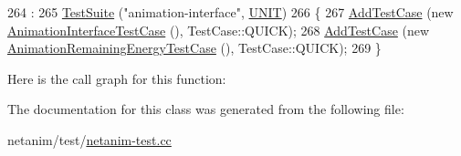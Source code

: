 \begin{DoxyCode}
264                                  :
265     \hyperlink{classns3_1_1TestSuite_a904b0c40583b744d30908aeb94636d1a}{TestSuite} (\textcolor{stringliteral}{"animation-interface"}, \hyperlink{classns3_1_1TestSuite_a1ebfcab34ec8161e085e8e3a1855eae0a3885375a3787abf60431f8454b3cadbd}{UNIT})
266   \{
267     \hyperlink{classns3_1_1TestCase_a3718088e3eefd5d6454569d2e0ddd835}{AddTestCase} (\textcolor{keyword}{new} \hyperlink{classAnimationInterfaceTestCase}{AnimationInterfaceTestCase} (), TestCase::QUICK);
268     \hyperlink{classns3_1_1TestCase_a3718088e3eefd5d6454569d2e0ddd835}{AddTestCase} (\textcolor{keyword}{new} \hyperlink{classAnimationRemainingEnergyTestCase}{AnimationRemainingEnergyTestCase} (), 
      TestCase::QUICK);
269   \}
\end{DoxyCode}


Here is the call graph for this function\+:




The documentation for this class was generated from the following file\+:\begin{DoxyCompactItemize}
\item 
netanim/test/\hyperlink{netanim-test_8cc}{netanim-\/test.\+cc}\end{DoxyCompactItemize}
